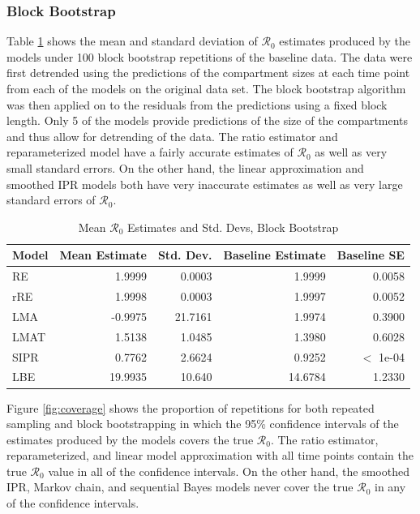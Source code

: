 \documentclass[12pt]{article}
\newcommand{\rr}{\ensuremath{\mathcal{R}_0}}
\begin{document}
\subsubsection{Block Bootstrap}

Table \ref{tab:bb-samp} shows the mean and standard deviation of $\rr$ estimates produced by the models under 100 block bootstrap repetitions of the baseline data. The data were first detrended using the predictions of the compartment sizes at each time point from each of the models on the original data set. The block bootstrap algorithm was then applied on to the residuals from the predictions using a fixed block length. Only 5 of the models provide predictions of the size of the compartments and thus allow for detrending of the data. The ratio estimator and reparameterized model have a fairly accurate estimates of $\rr$ as well as very small standard errors. On the other hand, the linear approximation and smoothed IPR models both have very inaccurate estimates as well as very large standard errors of $\rr$.

\begin{table}[H]
	
	\centering
	\begin{tabular}[t]{l|r|r|r|r}
		\hline
		Model & Mean Estimate & Std. Dev. & Baseline Estimate & Baseline SE\\
		\hline
		RE & 1.9999 & 0.0003 & 1.9999 & 0.0058\\
		\hline
		rRE & 1.9998 & 0.0003 & 1.9997 & 0.0052\\
		\hline
		LMA & -0.9975 & 21.7161 & 1.9974 & 0.3900\\
		\hline
		LMAT & 1.5138 & 1.0485 & 1.3980 & 0.6028 \\
		\hline
		SIPR & 0.7762 & 2.6624 & 0.9252 & $<$ 1e-04 \\
		\hline
		LBE & 19.9935 & 10.640 & 14.6784 & 1.2330 \\
		\hline
	\end{tabular}
	\caption{Mean $\rr$ Estimates and Std. Devs, Block Bootstrap}
	\label{tab:bb-samp}
\end{table}

Figure \ref{fig:coverage} shows the proportion of repetitions for both repeated sampling and block bootstrapping in which the 95\% confidence intervals of the estimates produced by the models covers the true $\rr$. The ratio estimator, reparameterized, and linear model approximation with all time points contain the true $\rr$ value in all of the confidence intervals. On the other hand, the smoothed IPR, Markov chain, and sequential Bayes models never cover the true $\rr$ in any of the confidence intervals.
\end{document}
